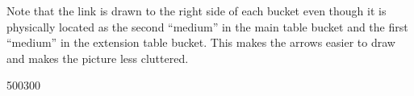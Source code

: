 Note that the link is drawn to the right side of
each bucket even though it is physically located as the second ``medium''
in the main table bucket and the first ``medium'' in the extension table
bucket.   This makes the arrows easier to draw and makes the picture less
cluttered.
\startfig
\begin{fast_picture}{500}{300}
\savFboxpos{}
\nextAbox\savBboxpos{}
         \unsavBboxpos{}\savBboxpos{}
         \unsavBboxpos{}\savBboxpos{}
         \unsavBboxpos{}\savBboxpos{}
         \unsavBboxpos{}\savBboxpos{}
         \unsavBboxpos{}\savBboxpos{}
         \unsavBboxpos{}\savBboxpos{}
         \groundunderarrow
\nextAbox\savBboxpos{}
         \unsavBboxpos{}\savBboxpos{}
         \unsavBboxpos{}\savBboxpos{}
         \unsavBboxpos{}\savBboxpos{}
         \unsavBboxpos{}\savBboxpos{}
         \unsavBboxpos{}\savBboxpos{}
         \unsavBboxpos{}\savBboxpos{}
\nextAbox\savBboxpos{}
         \unsavBboxpos{}\savBboxpos{}
         \unsavBboxpos{}\savBboxpos{}
         \unsavBboxpos{}\savBboxpos{}
         \unsavBboxpos{}\savBboxpos{}
         \unsavBboxpos{}\savBboxpos{}
         \unsavBboxpos{}\savBboxpos{}
\nextAbox\savBboxpos{}
         \unsavBboxpos{}\savBboxpos{}
         \unsavBboxpos{}\savBboxpos{}
         \unsavBboxpos{}\savBboxpos{}
         \unsavBboxpos{}\savBboxpos{}
         \unsavBboxpos{}\savBboxpos{}
         \unsavBboxpos{}\savBboxpos{}
\nextAbox\savBboxpos{}

\end{fast_picture}
